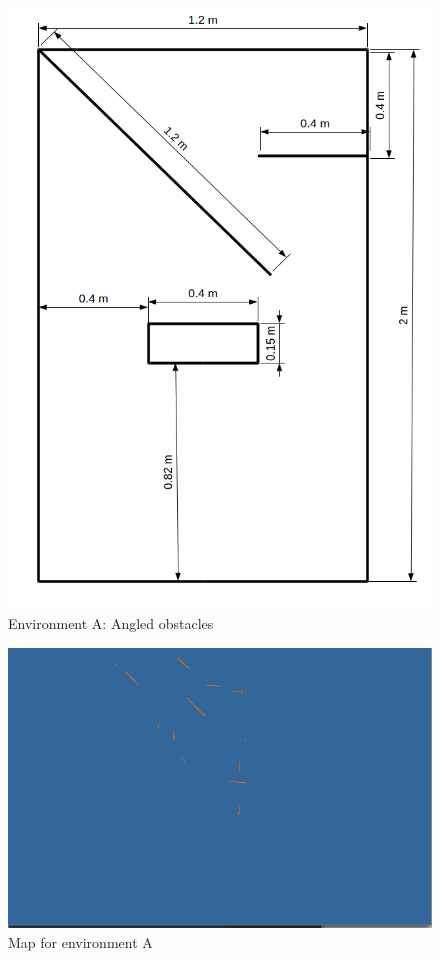 \begin{figure}[h]
\centering
\includegraphics[scale=0.4]{Chapter4/images/experiment_1.png}
\caption{Environment A: Angled obstacles}
\label{fig:experiment_a}
\end{figure}

\begin{figure}[h]
\centering
\includegraphics[scale=0.4]{Chapter4/images/experiment_1_map.png}
\caption{Map for environment A}
\label{fig:experiment_a_map}
\end{figure}

